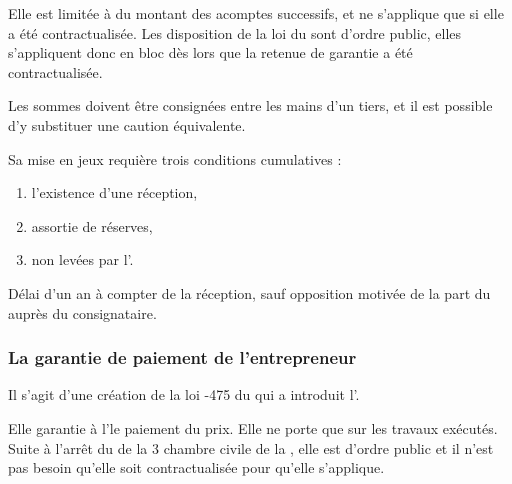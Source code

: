 				Elle est limitée à  du montant des acomptes successifs, et ne s'applique que si elle a été contractualisée. Les disposition de la loi du  sont d'ordre public, elles s'appliquent donc en bloc dès lors que la retenue de garantie a été contractualisée.

				Les sommes doivent être consignées entre les mains d'un tiers, et il est possible d'y substituer une caution équivalente.

				Sa mise en jeux requière trois conditions cumulatives :
				\begin{enumerate}
					\item l'existence d'une réception,
					\item assortie de réserves,
					\item non levées par l'\E.
				\end{enumerate}

				Délai d'un an à compter de la réception, sauf opposition motivée de la part du \Mo auprès du consignataire.

			\subsubsection{La garantie de paiement de l'entrepreneur}

				Il s'agit d'une création de la loi -475 du  qui a introduit l'.

				Elle garantie à l'\E le paiement du prix. Elle ne porte que sur les travaux exécutés. Suite à l'arrêt du  de la 3\ieme{} chambre civile de la \CourDeCas, elle est d'ordre public et il n'est pas besoin qu'elle soit contractualisée pour qu'elle s'applique.


